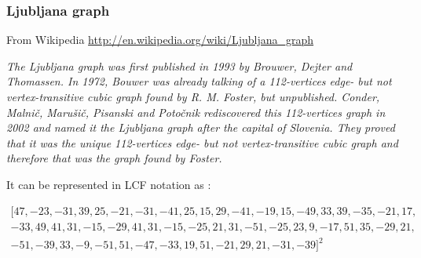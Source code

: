 \begin{center}
\begin{tkzexample}[vbox]
\end{tkzexample}
\end{center}

\subsubsection{Ljubljana graph}
From Wikipedia \url{http://en.wikipedia.org/wiki/Ljubljana_graph}

\emph{The Ljubljana graph was first published in 1993 by Brouwer, Dejter and Thomassen.
In 1972, Bouwer was already talking of a 112-vertices edge- but not vertex-transitive cubic graph found by R. M. Foster, but unpublished. Conder, Malnič, Marušič, Pisanski and Potočnik rediscovered this 112-vertices graph in 2002 and named it the Ljubljana graph after the capital of Slovenia. They proved that it was the unique 112-vertices edge- but not vertex-transitive cubic graph and therefore that was the graph found by Foster.} 

It can be   represented in LCF notation as  :

\[ 
\begin{array}{l}
\Big[ 47, -23, -31, 39, 25, -21, -31, -41, 25, 15, 29, -41, -19, 15, -49, 33, 39, -35, -21, 17,\\ -33, 49, 41, 31, -15, -29, 41, 31, -15, -25, 21, 31, -51, -25, 23, 9, -17, 51, 35, -29, 21,\\ -51, -39, 33, -9, -51, 51, -47, -33, 19, 51, -21,29, 21, -31, -39\Big]^2 
\end{array} 
\]   

   
  \begin{center}
\end{center} 

\begin{tkzexample}
\GraphInit[vstyle=Art]
\end{tkzexample} 
\vfill
\endinput
